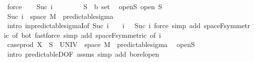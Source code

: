 \begin{isabellebody}
\ force\isanewline
{}\isamarkupfalse%
\isanewline
\ \ \isamarkupfalse%
\ {\isacharparenleft}{\kern0pt}Suc\ i{\isacharparenright}{\kern0pt}\isanewline
\ \ \isacommand{{\isacharbraceleft}{\kern0pt}}\isamarkupfalse%
\isanewline
\ \ \ \ \isamarkupfalse%
\ S\ {\isacharcolon}{\kern0pt}{\isacharcolon}{\kern0pt}\ {\isachardoublequoteopen}{\isacharprime}{\kern0pt}b\ set{\isachardoublequoteclose}\ \isamarkupfalse%
\ open{\isacharunderscore}{\kern0pt}S{\isacharcolon}{\kern0pt}\ {\isachardoublequoteopen}open\ S{\isachardoublequoteclose}\isanewline
\ \ \ \ \isamarkupfalse%
\ {\isachardoublequoteopen}{\isacharbraceleft}{\kern0pt}Suc\ i{\isacharbraceright}{\kern0pt}\ {\isasymtimes}\ space\ M\ {\isasymin}\ predictable{\isacharunderscore}{\kern0pt}sigma{\isachardoublequoteclose}\ \isamarkupfalse%
\ {\isacharparenleft}{\kern0pt}intro\ in{\isacharunderscore}{\kern0pt}predictable{\isacharunderscore}{\kern0pt}sigmaI{\isacharbrackleft}{\kern0pt}of\ {\isachardoublequoteopen}{\isacharbraceleft}{\kern0pt}Suc\ i{\isacharbraceright}{\kern0pt}{\isachardoublequoteclose}\ {\isacharunderscore}{\kern0pt}\ {\isachardoublequoteopen}{\isasymlambda}{\isacharunderscore}{\kern0pt}\ {\isacharunderscore}{\kern0pt}{\isachardot}{\kern0pt}\ i{\isachardoublequoteclose}\ {\isachardoublequoteopen}{\isasymlambda}{\isacharunderscore}{\kern0pt}\ {\isacharunderscore}{\kern0pt}{\isachardot}{\kern0pt}\ Suc\ i{\isachardoublequoteclose}{\isacharbrackright}{\kern0pt}{\isacharparenright}{\kern0pt}\ {\isacharparenleft}{\kern0pt}force\ simp\ add{\isacharcolon}{\kern0pt}\ space{\isacharunderscore}{\kern0pt}F{\isacharbrackleft}{\kern0pt}symmetric{\isacharcomma}{\kern0pt}\ of\ bot{\isacharbrackright}{\kern0pt}{\isacharcomma}{\kern0pt}\ fastforce\ simp\ add{\isacharcolon}{\kern0pt}\ space{\isacharunderscore}{\kern0pt}F{\isacharbrackleft}{\kern0pt}symmetric{\isacharcomma}{\kern0pt}\ of\ i{\isacharbrackright}{\kern0pt}{\isacharparenright}{\kern0pt}\isanewline
\ \ \ \ \isamarkupfalse%
\ \isamarkupfalse%
\ {\isachardoublequoteopen}case{\isacharunderscore}{\kern0pt}prod\ X\ {\isacharminus}{\kern0pt}{\isacharbackquote}{\kern0pt}\ S\ {\isasyminter}\ {\isacharparenleft}{\kern0pt}UNIV\ {\isasymtimes}\ space\ M{\isacharparenright}{\kern0pt}\ {\isasymin}\ predictable{\isacharunderscore}{\kern0pt}sigma{\isachardoublequoteclose}\ \isamarkupfalse%
\ open{\isacharunderscore}{\kern0pt}S\ \isamarkupfalse%
\ {\isacharparenleft}{\kern0pt}intro\ predictableD{\isacharbrackleft}{\kern0pt}OF\ assms{\isacharbrackright}{\kern0pt}{\isacharcomma}{\kern0pt}\ simp\ add{\isacharcolon}{\kern0pt}\ borel{\isacharunderscore}{\kern0pt}open{\isacharparenright}{\kern0pt}\isanewline

\end{isabellebody}
